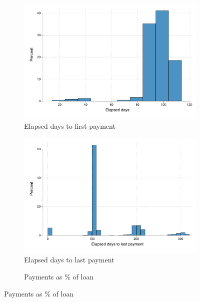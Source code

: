 \begin{figure}[H]
    \caption{Behavior of borrowers who lost their pawn}
    \label{proxy_naive}
    \begin{center}
    \begin{subfigure}{0.40\textwidth}
        \caption{Elapsed days to first payment}
        \centering
        \includegraphics[width=\textwidth]{Figuras/hist_firstdays_default.pdf}
    \end{subfigure}
    \begin{subfigure}{0.40\textwidth}
        \caption{Elapsed days to last payment}
        \centering
        \includegraphics[width=\textwidth]{Figuras/hist_days_default.pdf}
    \end{subfigure}
        \begin{subfigure}{0.40\textwidth}
        \caption{Payments as \% of loan}
        \centering

\end{subfigure}
\end{center}
\end{figure}
